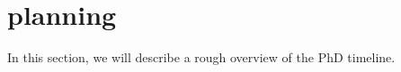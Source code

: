 \section{planning}
\label{sec:plan}
In this section, we will describe a rough overview of the PhD timeline.